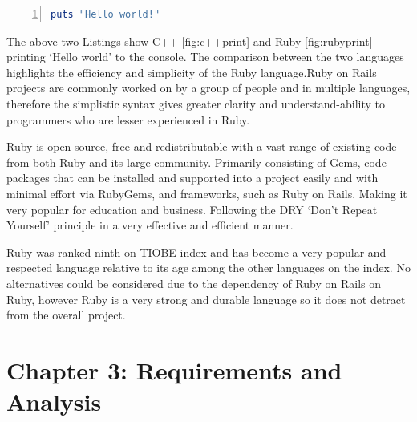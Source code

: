 \documentclass[a4paper,12pt]{article}
\begin{document}
\vspace{3mm}
\begin{lstlisting}[frame=single,numbers=left,language = ruby,caption= {Ruby print Hello world to console}, label={fig:rubyprint}]
puts "Hello world!"
\end{lstlisting}
\vspace{3mm}
\par The above two Listings show C++ \ref{fig:c++print} and Ruby \ref{fig:rubyprint} printing ‘Hello world’ to the console. The comparison between the two languages highlights the efficiency and simplicity of the Ruby language.Ruby on Rails projects are commonly worked on by a group of people and in multiple languages, therefore the simplistic syntax gives greater clarity and understand-ability to programmers who are lesser experienced in Ruby.\cite{AboutRuby}
\vspace{3mm}
\par Ruby is open source, free and redistributable with a vast range of existing code from both Ruby and its large community. Primarily consisting of Gems, code packages that can be installed and supported into a project easily and with minimal effort via RubyGems, and frameworks, such as Ruby on Rails. Making it very popular for education and business. Following the DRY ‘Don't Repeat Yourself’ principle in a very effective and efficient manner.\cite{AboutRuby}
\vspace{3mm}
\par Ruby was ranked ninth on TIOBE index\cite{TOBIE} and has become a very popular and respected language relative to its age among the other languages on the index. No alternatives could be considered due to the dependency of Ruby on Rails on Ruby, however Ruby is a very strong and durable language so it does not detract from the overall project.

\newpage
\section{Chapter 3: Requirements and Analysis}
\end{document}

